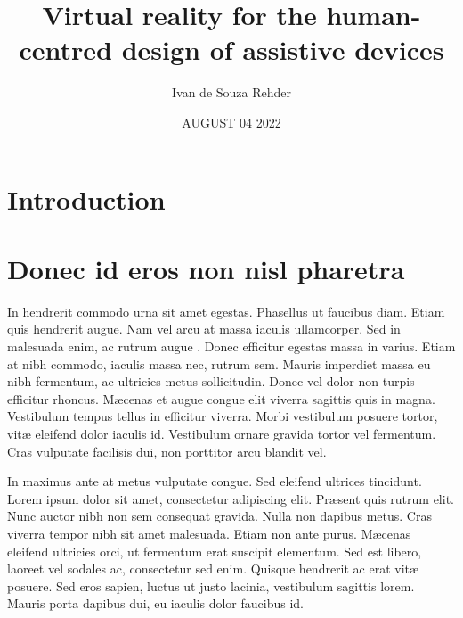 \documentclass[a4paper]{article}
\title{Virtual reality for the human-centred design of assistive devices}
\author{Ivan de Souza Rehder}
\date{AUGUST 04 2022}
\begin{document}
\maketitle

\section{Introduction} %


\section{Donec id eros non nisl pharetra} %

In hendrerit commodo urna sit amet egestas. Phasellus ut faucibus diam. Etiam quis hendrerit augue. Nam vel arcu at massa iaculis ullamcorper. Sed in malesuada enim, ac rutrum augue \cite{Lenat83a}. Donec efficitur egestas massa in varius. Etiam at nibh commodo, iaculis massa nec, rutrum sem. Mauris imperdiet massa eu nibh fermentum, ac ultricies metus sollicitudin. Donec vel dolor non turpis efficitur rhoncus. M\ae{}cenas et augue congue elit viverra sagittis quis in magna. Vestibulum tempus tellus in efficitur viverra. Morbi vestibulum posuere tortor, vit\ae{} eleifend dolor iaculis id. Vestibulum ornare gravida tortor vel fermentum. Cras vulputate facilisis dui, non porttitor arcu blandit vel.


In maximus ante at metus vulputate congue. Sed eleifend ultrices tincidunt. Lorem ipsum dolor sit amet, consectetur adipiscing elit. Pr\ae{}sent quis rutrum elit. Nunc auctor nibh non sem consequat gravida. Nulla non dapibus metus. Cras viverra tempor nibh sit amet malesuada. Etiam non ante purus. M\ae{}cenas eleifend ultricies orci, ut fermentum erat suscipit elementum. Sed est libero, laoreet vel sodales ac, consectetur sed enim. Quisque hendrerit ac erat vit\ae{} posuere. Sed eros sapien, luctus ut justo lacinia, vestibulum sagittis lorem. Mauris porta dapibus dui, eu iaculis dolor faucibus id. 


%

%
\end{document}
